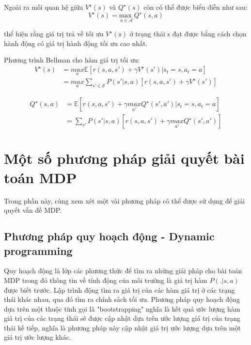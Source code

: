 \documentclass{uetgraduation}
\begin{document}
Ngoài ra mối quan hệ giữa $V^\star (s)$ và $Q^\star (s)$ còn có thể được biểu diễn như sau:
\begin{equation}
    V^\star (s) = \underset{a \in \mathcal{A}}{\text{max }} Q^\star (s, a)
    \label{eq:relation_v*_q*}
\end{equation}

thể hiện rằng giá trị trả về tối ưu $V^\star (s)$ ở trạng thái s đạt được bằng cách chọn hành động có giá trị hành động tối ưu cao nhất.

Phương trình Bellman cho hàm giá trị tối ưu:
\begin{equation}
    \begin{split}
        V^\star (s) &= \underset{a}{max } \mathbb{E} [r(s, a, s') + \gamma V^\star (s') | s_t = s, a_t = a] \\
        &= \underset{a}{max } \sum_{s' \in \mathcal{S}} P(s' | s, a) [r(s, a, s') + \gamma V^\star (s')]
    \end{split}
    \label{eq:v*_bellman}
\end{equation}

\begin{equation}
    \begin{split}
        Q^\star (s, a) &= \mathbb{E} [r(s, a, s') + \gamma \underset{a'}{ max } Q^\star (s', a') | s_t = s, a_t = a] \\
        &= \sum_{s'} P(s' | s, a) [r(s, a, s') + \gamma \underset{a'}{max } Q^\star (s', a')]
    \end{split}
    \label{eq:q*_bellman}
\end{equation}

\section{Một số phương pháp giải quyết bài toán MDP}
Trong phần này, cùng xem xét một vài phương pháp có thể được sử dụng để giải quyết vấn đề MDP.

\subsection{Phương pháp quy hoạch động - Dynamic programming}

Quy hoạch động là lớp các phương thức để tìm ra những giải pháp cho bài toán MDP trong đó thông tin về tính động của môi trường là giá trị hàm $P(.|s, a)$ được biết trước. Lập trình động tìm ra
giá trị của các hàm giá trị ở các trạng thái khác nhau, qua đó tìm ra chính sách tối ưu. Phương pháp quy hoạch động dựa trên một thuộc tính gọi là "bootstrapping" nghĩa là kết quả ước lượng hàm giá trị của
các trạng thái sẽ được cập nhật dựa trên ước lượng giá trị của trạng thái kế tiếp, nghĩa là phương pháp này cập nhật giá trị ước lượng dựa trên một giá trị ước lượng khác.
\end{document}
